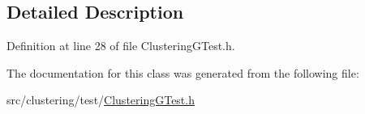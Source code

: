 \subsection{Detailed Description}


Definition at line 28 of file Clustering\-G\-Test.\-h.



The documentation for this class was generated from the following file\-:\begin{DoxyCompactItemize}
\item 
src/clustering/test/\hyperlink{_clustering_g_test_8h}{Clustering\-G\-Test.\-h}\end{DoxyCompactItemize}
